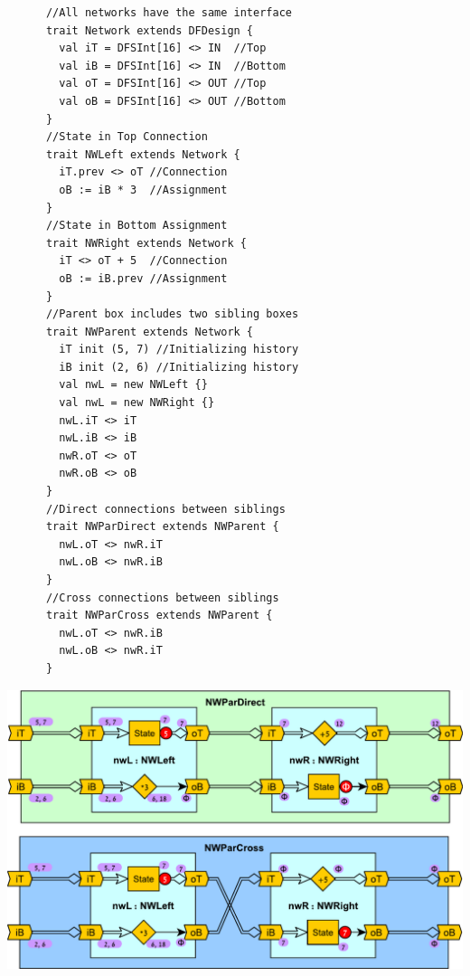 \begin{table}[t!]
  \small
  \begin{minipage}[t][9cm][t]{0.343\linewidth}
    \centering
    \captionsetup{justification=centering}
    \begin{verbatim}
      //All networks have the same interface
      trait Network extends DFDesign {
        val iT = DFSInt[16] <> IN  //Top
        val iB = DFSInt[16] <> IN  //Bottom
        val oT = DFSInt[16] <> OUT //Top
        val oB = DFSInt[16] <> OUT //Bottom
      }
      //State in Top Connection
      trait NWLeft extends Network {
        iT.prev <> oT //Connection
        oB := iB * 3  //Assignment
      }
      //State in Bottom Assignment
      trait NWRight extends Network {
        iT <> oT + 5  //Connection
        oB := iB.prev //Assignment
      }
      //Parent box includes two sibling boxes
      trait NWParent extends Network {
        iT init (5, 7) //Initializing history
        iB init (2, 6) //Initializing history
        val nwL = new NWLeft {}
        val nwL = new NWRight {}
        nwL.iT <> iT
        nwL.iB <> iB
        nwR.oT <> oT
        nwR.oB <> oB
      }
      //Direct connections between siblings
      trait NWParDirect extends NWParent {
        nwL.oT <> nwR.iT
        nwL.oB <> nwR.iB
      }
      //Cross connections between siblings
      trait NWParCross extends NWParent {
        nwL.oT <> nwR.iB
        nwL.oB <> nwR.iT
      }
    \end{verbatim}
    \vfill
    \label{fig:BoxTopCode}
  \end{minipage}%
  \hfill
  \begin{minipage}[t][12cm][b]{0.64\linewidth}
    \centering
    \captionsetup{justification=centering}
    \includegraphics[width=0.9\linewidth]{graphics/connectivity.pdf}

\end{minipage}
\end{table}
